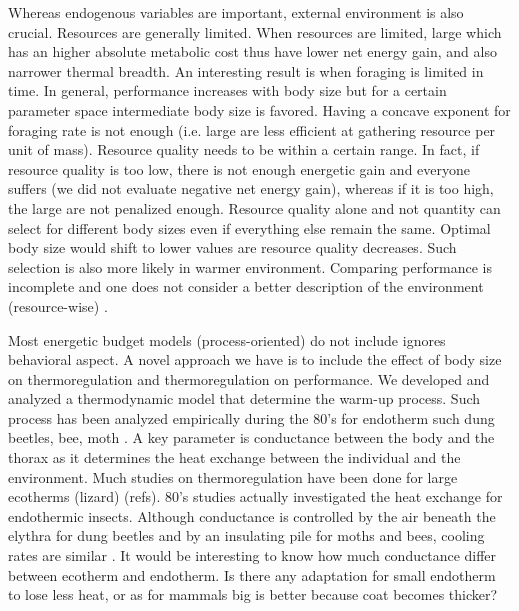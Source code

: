 Whereas endogenous variables are important, external environment is also crucial.
Resources are generally limited.
When resources are limited, large which has an higher absolute metabolic cost thus have lower net energy gain, and also narrower thermal breadth.
An interesting result is when foraging is limited in time.
In general, performance increases with body size but for a certain parameter space intermediate body size is favored.
Having a concave exponent for foraging rate is not enough (i.e. large are less efficient at gathering resource per unit of mass).
Resource quality needs to be within a certain range.
In fact, if resource quality is too low, there is not enough energetic gain and everyone suffers (we did not evaluate negative net energy gain), whereas if it is too high, the large are not penalized enough.
Resource quality alone and not quantity can select for different body sizes even if everything else remain the same.
Optimal body size would shift to lower values are resource quality decreases.
Such selection is also more likely in warmer environment.
Comparing performance is incomplete and one does not consider a better description of the environment (resource-wise) \citet{Sears2015}.

Most energetic budget models (process-oriented) do not include ignores behavioral aspect.
A novel approach we have is to include the effect of body size on thermoregulation and thermoregulation on performance.
We developed and analyzed a thermodynamic model that determine the warm-up process.
Such process has been analyzed empirically during the 80's  for endotherm  such dung beetles, bee, moth \citep{Heinrich1975, Bartholomew1978, Bartholomew1981}.
A key parameter is conductance between the body and the thorax as it determines the heat exchange between the individual and the environment.
Much studies on thermoregulation have been done for large ecotherms (lizard) (refs).
80's studies actually investigated the heat exchange for endothermic insects.
Although conductance is controlled by the air beneath the elythra for dung beetles and by an insulating pile for moths and bees, cooling rates are similar \citep{Bartholomew1978}.  
It would be interesting to know  how much conductance differ between ecotherm and endotherm.
Is there any adaptation for small endotherm to lose less heat, or as for mammals big is better because coat becomes thicker?


